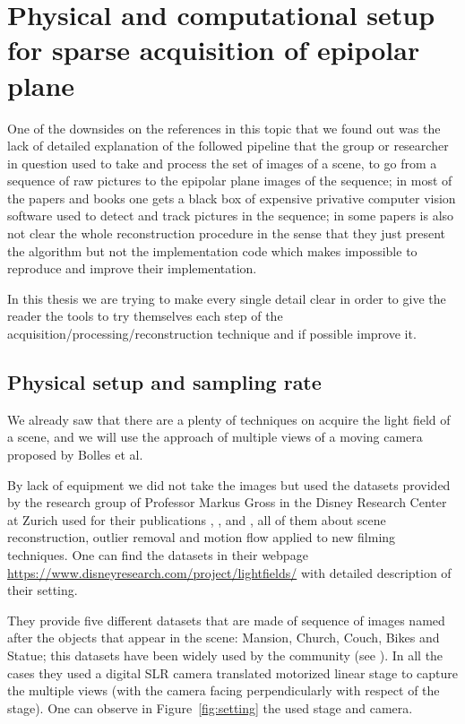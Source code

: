 \section{Physical and computational setup for sparse acquisition of epipolar plane}
\label{sec:Sparse-acquisition}

One of the downsides on the references in this topic that we found out was the lack of detailed explanation of the followed pipeline that the group or researcher in question used to take and process the set of images of a scene, to go from a sequence of raw pictures to the epipolar plane images of the sequence; in most of the papers and books one gets a black box of expensive privative computer vision software used to detect and track pictures in the sequence; in some papers is also not clear the whole reconstruction procedure in the sense that they just present the algorithm but not the implementation code which makes impossible to reproduce and improve their implementation.

\bigskip

In this thesis we are trying to make every single detail clear in order to give the reader the tools to try themselves each step of the acquisition/processing/reconstruction technique and if possible improve it. 

\subsection{Physical setup and sampling rate}

We already saw that there are a plenty of techniques on acquire the light field of a scene, and we will use the approach of multiple views of a moving camera proposed by Bolles et al.\ 

\bigskip 

By lack of equipment we did not take the images but used the datasets provided by the research group of Professor Markus Gross in the Disney Research Center at Zurich used for their publications \cite{ChangilPhD}, \cite{PointCloud}, \cite{SceneRec} and \cite{StructMot}, all of them about scene reconstruction, outlier removal and motion flow applied to new filming techniques. One can find the datasets in their webpage \url{https://www.disneyresearch.com/project/lightfields/} with detailed description of their setting. 

\bigskip

They provide five different datasets that are made of sequence of images named after the objects that appear in the scene: Mansion, Church, Couch, Bikes and Statue; this datasets have been widely used by the community (see \cite{LF-Shearlets}). In all the cases they used a digital SLR camera translated motorized linear stage to capture the multiple views (with the camera facing perpendicularly with respect of the stage). One can observe in Figure~\ref{fig:setting} the used stage and camera.

